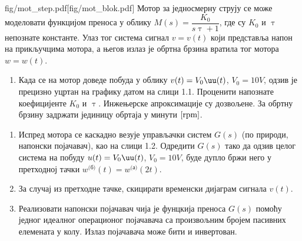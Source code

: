 \mnDifficult
\begin{slikaDesno}{fig/mot_step.pdf}[fig/mot_blok.pdf]
\PID
Мотор за једносмерну струју се може моделовати функцијом преноса у облику $M(s) = \dfrac{K_0}{s\uptau + 1}$, где 
су $K_0$ и $\uptau$ непознате константе. Улаз тог система 
сигнал $v = v(t)$ који представља напон на прикључцима мотора, а његов излаз је обртна брзина вратила тог мотора 
$w = w(t)$. \\[1mm]
\begin{enumerate}[label=(\alph*)] 
    \itemsep1pt
    \item Када се на мотор доведе побуда у облику
    $v(t) = V_0 \uu(t)$, $V_0 = 10\unit{V}$, одзив је прецизно уцртан на 
    графику датом на слици 1.1. 
    Проценити напознате коефицијенте 
    $K_0$ и $\uptau$. Инжењерске апроксимације су дозвољене. 
    За обртну брзину задржати јединицу обртаја у минути 
    $\rm[rpm]$. 
\end{enumerate}
\end{slikaDesno}
\begin{enumerate}[label=(\alph*)]
    \item Испред мотора се каскадно везује 
    управљачки систем $G(s)$ (по природи, напонски
    појачавач), као на слици 1.2. 
    Одредити $G(s)$ тако да одзив целог система 
    на побуду $u(t) = V_0\uu(t)$, $V_0 = 10\unit{V}$,
    буде дупло бржи него у претходној тачки 
    $w^{\text{(б)}}(t) =  w^{\text{(а)}}(2t)$. 
    \item 
    За случај из претходне тачке, 
    скицирати временски дијаграм сигнала $v(t)$. 
    \item 
    Реализовати напонски појачавач чија је фунцкија преноса $G(s)$ помоћу једног 
    идеалног операционог појачавача са произвољним бројем пасивних елемената у колу. 
    Излаз појачавача може бити и инвертован. 
\end{enumerate}

\RESENJE

